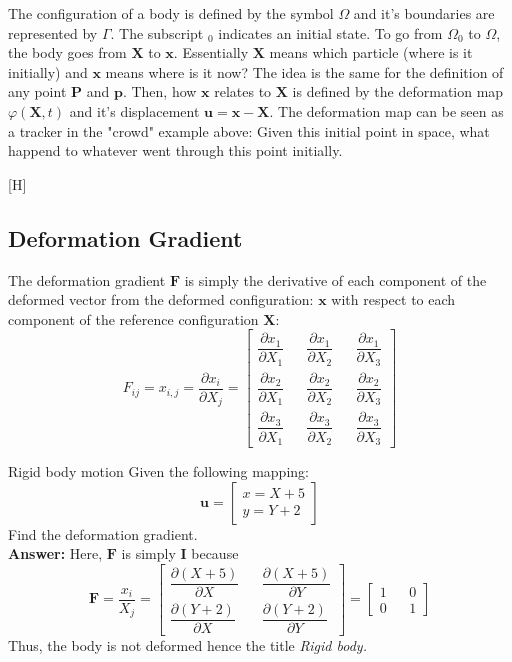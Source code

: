 The configuration of a body is defined by the symbol $\Omega$ and it's boundaries are represented by $\Gamma$. The subscript $_0$ indicates an initial state. To go from $\Omega_0$ to $\Omega$, the body goes from $\mathbf{X}$ to $\mathbf{x}$. Essentially $\mathbf{X}$ means which particle (where is it initially) and $\mathbf{x}$ means where is it now? The idea is the same for the definition of any point $\mathbf{P}$ and $\mathbf{p}$. Then, how $\mathbf{x}$ relates to $\mathbf{X}$ is defined by the deformation map $\varphi(\mathbf{X},t)$ and it's displacement $\mathbf{u}=\mathbf{x} - \mathbf{X}$. The deformation map can be seen as a tracker in the "crowd" example above: Given this initial point in space, what happend to whatever went through this point initially.

[H]


\subsection{Deformation Gradient}
The deformation gradient $\mathbf{F}$ is simply the derivative of each component of the deformed vector from the deformed configuration:  $\mathbf{x}$ with respect to each component of the reference configuration $\mathbf{X}$:
\begin{equation}
    \label{eq:deformationgradient}
    F_{ij}=
    x_{i,j}=
    \dfrac{\partial x_{i}}{\partial X_j}
    = \begin{bmatrix}
        \dfrac{\partial x_{1}}{\partial X_1} && \dfrac{\partial x_{1}}{\partial X_2 } && \dfrac{\partial x_{1}}{\partial X_3} \\
        \dfrac{\partial x_{2}}{\partial X_1} && \dfrac{\partial x_{2}}{\partial X_2 } && \dfrac{\partial x_{2}}{\partial X_3} \\
        \dfrac{\partial x_{3}}{\partial X_1} && \dfrac{\partial x_{3}}{\partial X_2 } && \dfrac{\partial x_{3}}{\partial X_3}
    \end{bmatrix}
\end{equation}

\begin{example}{Rigid body motion}
    Given the following mapping:
$$ 
    \mathbf{u} = \begin{bmatrix}
        x = X + 5 \\
        y = Y + 2
    \end{bmatrix}
$$
Find the deformation gradient.\\
\textbf{Answer: } Here, $\mathbf{F}$ is simply $\mathbf{I}$ because
$$
    \mathbf{F}=\dfrac{x_i}{X_j}=\begin{bmatrix}
        \dfrac{\partial (X + 5)}{\partial X} && \dfrac{\partial (X + 5)}{\partial Y}\\
        \dfrac{\partial (Y + 2)}{\partial X} && \dfrac{\partial (Y + 2)}{\partial Y}
    \end{bmatrix}
    =
    \begin{bmatrix}
        1 && 0 \\
        0 && 1
    \end{bmatrix}
$$
Thus, the body is not deformed hence the title \it{Rigid body}.
\end{example}

